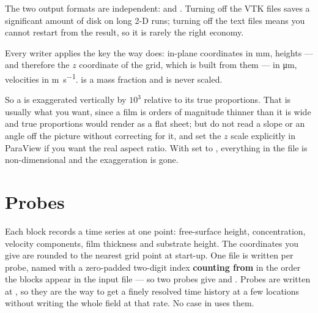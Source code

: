 The two output formats are independent: 
and . Turning off the VTK files saves a
significant amount of disk on long 2-D runs; turning off the text files means
you cannot restart from the result, so it is rarely the right economy.

\begin{warn}
  Every  writer applies the key the way  does:
  in-plane coordinates in \si{\milli\metre}, heights --- and therefore the
  $z$ coordinate of the grid, which is built from them --- in
  \si{\micro\metre}, velocities in \si{\metre\per\second}.
   is a mass fraction and is never scaled.

  So a  is exaggerated vertically by $10^{3}$ relative to its true
  proportions. That is usually what you want, since a film is orders of
  magnitude thinner than it is wide and true proportions would render as a
  flat sheet; but do not read a slope or an angle off the picture without
  correcting for it, and set the $z$ scale explicitly in ParaView if you want
  the real aspect ratio. With  set to ,
  everything in the file is non-dimensional and the exaggeration is gone.
\end{warn}

\section{Probes}
\label{sec:output:probes}

Each  block records a time series at one point:
free-surface height, concentration, velocity components, film thickness and
substrate height. The coordinates you give are rounded to the nearest grid
point at start-up. One file is written per probe, named  with
 a zero-padded two-digit index \textbf{counting from } in the
order the blocks appear in the input file --- so two probes give
 and . Probes are written at
,
so they are the way to get a finely resolved time history at a few locations
without writing the whole field at that rate. No case in  uses
them.
